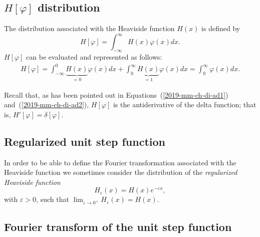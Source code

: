\subsection{$H  \left[ \varphi \right]$ distribution}
The distribution associated with the Heaviside function $H(x)$ is defined by
\begin{equation}
H \left[ \varphi \right] =
\int_{-\infty}^\infty  H(x)  \varphi(x) dx.
 \end{equation}
$H  \left[ \varphi \right]$
can be evaluated and represented as follows:
\begin{equation}
\begin{split}
H  \left[ \varphi \right]
=
\int_{-\infty}^0  \underbrace{H(x)}_{=0} \varphi(x) dx
+
\int_{0}^\infty  \underbrace{H(x)}_{=1} \varphi(x) dx
=
\int_{0}^\infty      \varphi(x) dx
.
\end{split}
\end{equation}

Recall that, as has been pointed out in Equations~(\ref{2019-mm-ch-di-ad1}) and~(\ref{2019-mm-ch-di-ad2}),
$H\left[ \varphi \right]$ is the antiderivative of the delta function; that is, $H'\left[ \varphi \right]=\delta\left[ \varphi \right]$.

\subsection{Regularized unit step function}
In order to be able to define the Fourier transformation
associated with the Heaviside function  we sometimes
consider the distribution of the {\em regularized Heaviside function}
\begin{equation}
H_\varepsilon (x) =H(x)e^{-\varepsilon x},
\label{2012-m-ch-di-rhfun}
\end{equation}
 with $\varepsilon >0$,
such that $\lim_{\varepsilon \rightarrow 0^+}  H_\varepsilon (x) =H (x)$.



\subsection{Fourier transform  of  the unit step function}


